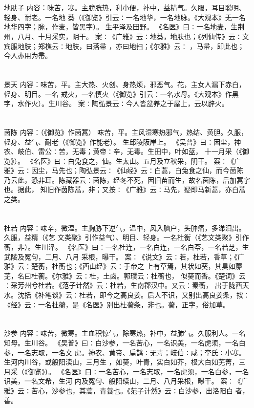 \documentclass[12pt,UTF8]{ctexbook}
\begin{document}
\chapter{}地肤子
内容：味苦，寒。主膀胱热，利小便，补中，益精气。久服，耳目聪明、轻身、耐老。一名地 
葵（《御览》引云∶一名地华，一名地脉。《大观本》无一名地华四字；脉，作麦，皆黑字）。 
生平泽及田野。 
《名医》曰∶一名地麦，生荆州，八月、十月采实，阴干。 
案∶《广雅》云∶地葵，地肤也；《列仙传》云∶文宾服地肤；郑樵云∶地肤，曰落帚 
，亦曰地扫；《尔雅》云∶ ，马帚，即此也；今人亦用为帚。 


\chapter{}景天
内容：味苦，平。主大热、火创、身热烦，邪恶气。花，主女人漏下赤白，轻身、明目。一名 
戒火，一名慎火（《御览》引云∶一名水母。《大观本》作黑字，水作火）。生川谷。 
案∶陶弘景云∶今人皆盆养之于屋上，云以辟火。 


\chapter{}茵陈
内容：（《御览》作茵蒿） 
味苦，平。主风湿寒热邪气，热结、黄胆。久服，轻身、益气、耐老（《御览》作能老）。 
生邱陵阪岸上。 
《吴普》曰∶因尘，神农、岐伯、雷公∶苦，无毒；黄帝∶辛，无毒。生田中，叶如蓝， 
十一月采（《御览》）。 
《名医》曰∶白兔食之，仙。生太山。五月及立秋采，阴干。 
案∶《广雅》云∶因尘，马先也；陶弘景云∶《仙经》云∶白蒿，白兔食之仙，而今茵陈 
乃云此，恐非耳。陈藏器云∶茵陈，经冬不死，因旧苗而生，故名茵陈，后加蒿字也。据此， 
知旧作茵陈蒿，非；又按∶《广雅》云∶马先，疑即马新蒿，亦白蒿之类。 


\chapter{}杜若
内容：味辛，微温。主胸胁下逆气，温中，风入脑户，头肿痛，多涕泪出。久服，益精（《艺 
文类聚》引作益气）、明目、轻身。一名杜衡（《艺文类聚》引作蘅，非）。生川泽。 
《名医》曰∶一名杜连，一名白连，一名白苓，一名若芝，生武陵及冤句，二月、八月 
采根，曝干。 
案∶《说文》云∶若，杜若，香草；《广雅》云∶楚蘅，杜蘅也；《西山经》云∶于帝之 
上有草焉，其状如葵，其臭如蘼芜，名曰杜蘅。《尔雅》云∶杜，土卤。郭璞云∶杜蘅也， 
似葵而香。《楚词》云∶采芳州兮杜若。《范子计然》云∶杜若，生南郡汉中。又云∶秦蘅， 
出于陇西天水。沈括《补笔谈》云∶杜若，即今之高良姜。后人不识，又别出高良姜条，按∶ 
《经》云∶一名杜蘅，是《名医》别出杜蘅条，非也。蘅，正字，俗加草。 


\chapter{}沙参
内容：味苦，微寒。主血积惊气，除寒热，补中，益肺气。久服利人。一名知母。生川谷。 
《吴普》曰∶白沙参，一名苦心，一名识美，一名虎须，一名白参，一名志取，一名文 
虎。神农、黄帝、扁鹊∶无毒；岐伯∶咸；李氏∶小寒。生河内川谷，或般阳渎山，三月生 
，如葵，叶青，实白如芥，根大白如芜菁，三月采（《御览》）。 
《名医》曰∶一名苦心，一名志取，一名虎须，一名白参，一名识美，一名文希，生河 
内及冤句、般阳续山，二月、八月采根，曝干。 
案∶《广雅》云∶苦心，沙参也，其蒿，青蓑也。《范子计然》云∶白沙参，出洛阳白 
者，善。 
\end{document}
